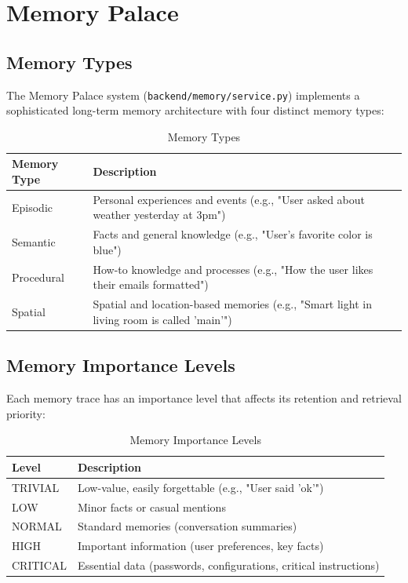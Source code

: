 \documentclass[12pt,a4paper,twoside]{report}
\begin{document}
\section{Memory Palace}

\subsection{Memory Types}

The Memory Palace system (\texttt{backend/memory/service.py}) implements a sophisticated long-term memory architecture with four distinct memory types:

\begin{table}[H]
\centering
\begin{tabularx}{\textwidth}{|l|X|}
\hline
\rowcolor{phiblue!20}
\textbf{Memory Type} & \textbf{Description} \\
\hline
Episodic & Personal experiences and events (e.g., "User asked about weather yesterday at 3pm") \\
\hline
Semantic & Facts and general knowledge (e.g., "User's favorite color is blue") \\
\hline
Procedural & How-to knowledge and processes (e.g., "How the user likes their emails formatted") \\
\hline
Spatial & Spatial and location-based memories (e.g., "Smart light in living room is called 'main'") \\
\hline
\end{tabularx}
\caption{Memory Types}
\end{table}

\subsection{Memory Importance Levels}

Each memory trace has an importance level that affects its retention and retrieval priority:

\begin{table}[H]
\centering
\begin{tabularx}{\textwidth}{|l|X|}
\hline
\rowcolor{phiblue!20}
\textbf{Level} & \textbf{Description} \\
\hline
TRIVIAL & Low-value, easily forgettable (e.g., "User said 'ok'") \\
\hline
LOW & Minor facts or casual mentions \\
\hline
NORMAL & Standard memories (conversation summaries) \\
\hline
HIGH & Important information (user preferences, key facts) \\
\hline
CRITICAL & Essential data (passwords, configurations, critical instructions) \\
\hline
\end{tabularx}
\caption{Memory Importance Levels}
\end{table}
\end{document}
